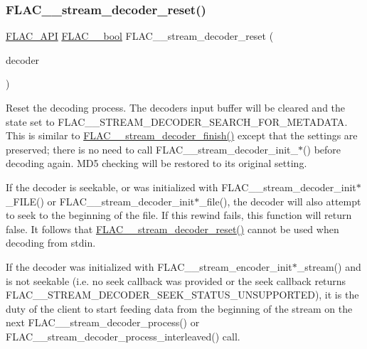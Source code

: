 \subsubsection{\texorpdfstring{FLAC\_\_stream\_decoder\_reset()}{FLAC\_\_stream\_decoder\_reset()}}
{\footnotesize\ttfamily \mbox{\hyperlink{group__flac__export_ga56ca07df8a23310707732b1c0007d6f5}{F\+L\+A\+C\+\_\+\+A\+PI}} \mbox{\hyperlink{ordinals_8h_a95103469f1cbd78b8cf250194985b34e}{F\+L\+A\+C\+\_\+\+\_\+bool}} F\+L\+A\+C\+\_\+\+\_\+stream\+\_\+decoder\+\_\+reset (\begin{DoxyParamCaption}\item[{\mbox{\hyperlink{struct_f_l_a_c_____stream_decoder}{F\+L\+A\+C\+\_\+\+\_\+\+Stream\+Decoder}} $\ast$}]{decoder }\end{DoxyParamCaption})}

Reset the decoding process. The decoder\textquotesingle{}s input buffer will be cleared and the state set to {\ttfamily F\+L\+A\+C\+\_\+\+\_\+\+S\+T\+R\+E\+A\+M\+\_\+\+D\+E\+C\+O\+D\+E\+R\+\_\+\+S\+E\+A\+R\+C\+H\+\_\+\+F\+O\+R\+\_\+\+M\+E\+T\+A\+D\+A\+TA}. This is similar to \mbox{\hyperlink{group__flac__stream__decoder_gaa51bb38f762ee11b320a0839f165c5ce}{F\+L\+A\+C\+\_\+\+\_\+stream\+\_\+decoder\+\_\+finish()}} except that the settings are preserved; there is no need to call F\+L\+A\+C\+\_\+\+\_\+stream\+\_\+decoder\+\_\+init\+\_\+$\ast$() before decoding again. M\+D5 checking will be restored to its original setting.

If the decoder is seekable, or was initialized with F\+L\+A\+C\+\_\+\+\_\+stream\+\_\+decoder\+\_\+init$\ast$\+\_\+\+F\+I\+LE() or F\+L\+A\+C\+\_\+\+\_\+stream\+\_\+decoder\+\_\+init$\ast$\+\_\+file(), the decoder will also attempt to seek to the beginning of the file. If this rewind fails, this function will return {\ttfamily false}. It follows that \mbox{\hyperlink{group__flac__stream__decoder_ga2342cf4f3caf9ad20fca1373aaea0c27}{F\+L\+A\+C\+\_\+\+\_\+stream\+\_\+decoder\+\_\+reset()}} cannot be used when decoding from {\ttfamily stdin}.

If the decoder was initialized with F\+L\+A\+C\+\_\+\+\_\+stream\+\_\+encoder\+\_\+init$\ast$\+\_\+stream() and is not seekable (i.\+e. no seek callback was provided or the seek callback returns {\ttfamily F\+L\+A\+C\+\_\+\+\_\+\+S\+T\+R\+E\+A\+M\+\_\+\+D\+E\+C\+O\+D\+E\+R\+\_\+\+S\+E\+E\+K\+\_\+\+S\+T\+A\+T\+U\+S\+\_\+\+U\+N\+S\+U\+P\+P\+O\+R\+T\+ED}), it is the duty of the client to start feeding data from the beginning of the stream on the next F\+L\+A\+C\+\_\+\+\_\+stream\+\_\+decoder\+\_\+process() or F\+L\+A\+C\+\_\+\+\_\+stream\+\_\+decoder\+\_\+process\+\_\+interleaved() call.


